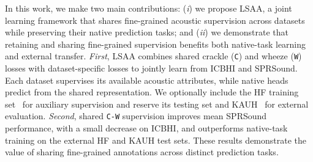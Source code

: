 



In this work, we make two main contributions: (\emph{i}) we propose LSAA, a joint learning framework that shares fine-grained acoustic supervision across datasets while preserving their native prediction tasks; and (\emph{ii}) we demonstrate that retaining and sharing fine-grained supervision benefits both native-task learning and external transfer.
\emph{First}, LSAA combines shared crackle (\texttt{C}) and wheeze (\texttt{W}) losses with dataset-specific losses to jointly learn from ICBHI and SPRSound. Each dataset supervises its available acoustic attributes, while native heads predict from the shared representation. We optionally include the HF training set~\cite{hsu2021hflung} for auxiliary supervision and reserve its testing set and KAUH~\cite{fraiwan2021kauh} for external evaluation.
\emph{Second}, shared \texttt{C-W} supervision improves mean SPRSound performance, with a small decrease on ICBHI, and outperforms native-task training on the external HF and KAUH test sets. These results demonstrate the value of sharing fine-grained annotations across distinct prediction tasks.

